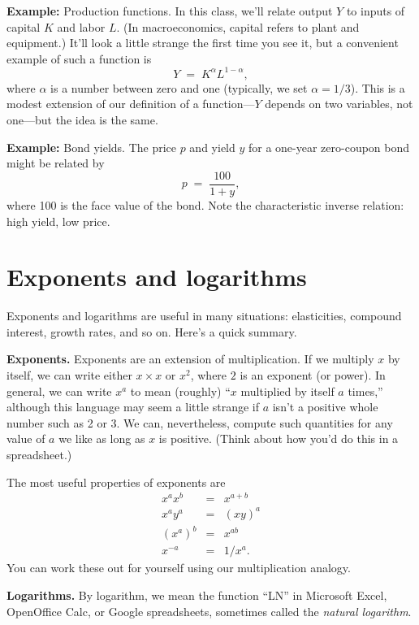 \textbf{Example:} Production functions. 
In this class, we'll relate output $Y$ to inputs of capital $K$ and labor $L$.
(In macroeconomics, capital refers to plant and equipment.)
It'll look a little strange the first time you see it,
but a convenient example of such a function is
\[
    Y \;=\; K^\alpha L^{1-\alpha} ,
\]
where $\alpha$ is a number between zero and one (typically, we set $\alpha = 1/3$).
This is a modest extension of our definition of a function---$Y$ depends on two variables, not one---but the idea is the same.

\textbf{Example:} Bond yields. 
The price $p$ and yield 
 $y$ for a one-year zero-coupon bond 
might be related by
\[
    p \;=\; \frac{100}{1+y},
\]
where 100 is the face value of the bond. 
Note the characteristic inverse relation:  high yield, low price.


\section{Exponents and logarithms}

Exponents and logarithms are useful in many situations:
elasticities, compound interest, growth rates, and so on.
Here's a quick summary.

\textbf{Exponents.} Exponents are an extension of multiplication.
If we multiply $x$ by itself, we can write either $ x \times x $ or $x^2$,
where $2$ is an exponent (or power).
In general, we can write $x^a$ to mean (roughly) ``$x$ multiplied by itself $a$ times,''
although this language may seem a little strange
if $a$ isn't a positive whole number such as 2 or 3.
We can, nevertheless, compute such quantities for any value of $a$ we like
as long as $x$ is positive.
(Think about how you'd do this in a spreadsheet.)


The most useful properties of exponents are
\begin{eqnarray*}
    x^a x^b &=& x^{a+b} \\
    x^a y^a &=& (xy)^a \\
    (x^a)^b &=& x^{ab} \\
    x^{-a} &=& {1}/{x^a}.
\end{eqnarray*}
You can work these out for yourself using our multiplication analogy.


\textbf{Logarithms.}
By logarithm, we mean the function ``LN'' in
Microsoft Excel, OpenOffice Calc, or Google spreadsheets,
sometimes called the \textit{natural logarithm}.


